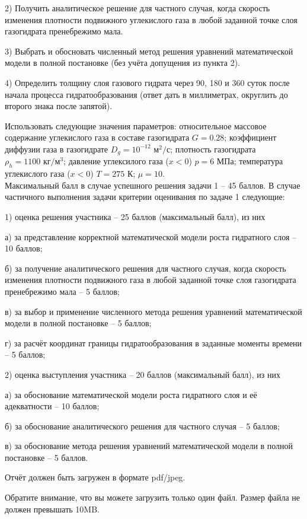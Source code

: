 \documentclass[a4paper, 12pt]{article}
\begin{document}
2) Получить аналитическое решение для частного случая, когда скорость изменения плотности подвижного углекислого газа в любой заданной точке слоя газогидрата пренебрежимо мала.

3) Выбрать и обосновать численный метод решения уравнений математической модели в полной постановке (без учёта допущения из пункта 2).

4) Определить толщину слоя газового гидрата через 90, 180 и 360 суток после начала процесса гидратообразования (ответ дать в миллиметрах, округлить до второго знака после запятой).

Использовать следующие значения параметров: относительное массовое содержание углекислого газа в составе газогидрата $G=0.28$; коэффициент диффузии газа в газогидрате $D_g=10^{-12}\text{ м}^2/\text{с}$; плотность газогидрата $\rho_h=1100\text{ кг}/\text{м}^3$; давление углексилого газа ($x<0$) $p=6\text{ МПа}$; температура углекислого газа ($x<0$) $T=275\text{ К}$; $\mu=10$.\\

Максимальный балл в случае успешного решения задачи 1 -- 45 баллов.
В случае частичного выполнения задачи критерии оценивания по задаче 1 следующие:

1) оценка решения участника -- 25 баллов (максимальный балл), из них

\hspace{7pt} а) за представление корректной математической модели роста гидратного слоя -- 10 баллов;

\hspace{10pt} б) за получение аналитического решения для частного случая, когда скорость изменения плотности подвижного газа в любой заданной точке слоя газогидрата пренебрежимо мала -- 5 баллов;

\hspace{10pt} в) за выбор и применение численного метода решения уравнений математической модели в полной постановке -- 5 баллов;

\hspace{10pt} г) за расчёт координат границы гидратообразования в заданные моменты времени -- 5 баллов;

2) оценка выступления участника -- 20 баллов (максимальный балл), из них

\hspace{10pt} а) за обоснование математической модели роста гидратного слоя и её адекватности -- 10 баллов;

\hspace{10pt} б) за обоснование аналитического решения для частного случая -- 5 баллов;

\hspace{10pt} в) за обоснование метода решения уравнений математической модели в полной постановке -- 5 баллов.

Отчёт должен быть загружен в формате pdf/jpeg.

Обратите внимание, что вы можете загрузить только один файл.
Размер файла не должен превышать 10MB.
\end{document}
